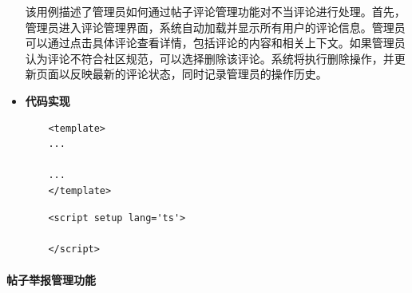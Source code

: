 \begin{itemize}
	该用例描述了管理员如何通过帖子评论管理功能对不当评论进行处理。首先，管理员进入评论管理界面，系统自动加载并显示所有用户的评论信息。管理员可以通过点击具体评论查看详情，包括评论的内容和相关上下文。如果管理员认为评论不符合社区规范，可以选择删除该评论。系统将执行删除操作，并更新页面以反映最新的评论状态，同时记录管理员的操作历史。
	
	\item \textbf{代码实现}
	\begin{verbatim}
	<template>
	...
	
	...
	</template>
	\end{verbatim}
	
	\begin{verbatim}
	<script setup lang='ts'>
	
	</script>
	\end{verbatim}
\end{itemize}

\paragraph{帖子举报管理功能}

